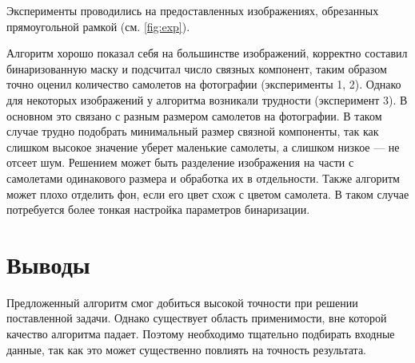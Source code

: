 \documentclass[11pt]{extarticle}
\begin{document}
Эксперименты проводились на предоставленных изображениях, обрезанных прямоугольной рамкой (см. \autoref{fig:exp}).

Алгоритм хорошо показал себя на большинстве изображений, корректно составил бинаризованную маску и подсчитал число связных компонент, таким образом точно оценил количество самолетов на фотографии (эксперименты 1, 2). Однако для некоторых изображений у алгоритма возникали трудности (эксперимент 3). В основном это связано с разным размером самолетов на фотографии. В таком случае трудно подобрать минимальный размер связной компоненты, так как слишком высокое значение уберет маленькие самолеты, а слишком низкое --- не отсеет шум. Решением может быть разделение изображения на части с самолетами одинакового размера и обработка их в отдельности. Также алгоритм может плохо отделить фон, если его цвет схож с цветом самолета. В таком случае потребуется более тонкая настройка параметров бинаризации.

\section{Выводы}
Предложенный алгоритм смог добиться высокой точности при решении поставленной задачи. Однако существует область применимости, вне которой качество алгоритма падает. Поэтому необходимо тщательно подбирать входные данные, так как это может существенно повлиять на точность результата.
\end{document}
